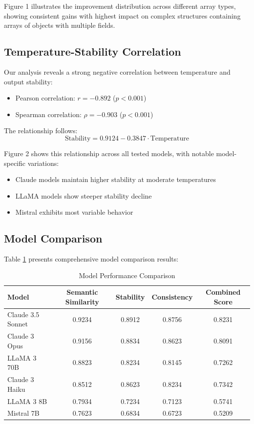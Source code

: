 \documentclass[letterpaper]{article} %
\begin{document}
Figure 1 illustrates the improvement distribution across different array types, showing consistent gains with highest impact on complex structures containing arrays of objects with multiple fields.

\subsection{Temperature-Stability Correlation}

Our analysis reveals a strong negative correlation between temperature and output stability:
\begin{itemize}
\item Pearson correlation: $r = -0.892$ ($p < 0.001$)
\item Spearman correlation: $\rho = -0.903$ ($p < 0.001$)
\end{itemize}

The relationship follows:
\begin{equation}
\text{Stability} = 0.9124 - 0.3847 \cdot \text{Temperature}
\end{equation}

Figure 2 shows this relationship across all tested models, with notable model-specific variations:
\begin{itemize}
\item Claude models maintain higher stability at moderate temperatures
\item LLaMA models show steeper stability decline
\item Mistral exhibits most variable behavior
\end{itemize}

\subsection{Model Comparison}

Table \ref{tab:model_comparison} presents comprehensive model comparison results:

\begin{table}[h]
\centering
\caption{Model Performance Comparison}
\label{tab:model_comparison}
\begin{tabular}{lcccc}
\toprule
Model & Semantic Similarity & Stability & Consistency & Combined Score \\
\midrule
Claude 3.5 Sonnet & 0.9234 & 0.8912 & 0.8756 & 0.8231 \\
Claude 3 Opus & 0.9156 & 0.8834 & 0.8623 & 0.8091 \\
LLaMA 3 70B & 0.8823 & 0.8234 & 0.8145 & 0.7262 \\
Claude 3 Haiku & 0.8512 & 0.8623 & 0.8234 & 0.7342 \\
LLaMA 3 8B & 0.7934 & 0.7234 & 0.7123 & 0.5741 \\
Mistral 7B & 0.7623 & 0.6834 & 0.6723 & 0.5209 \\
\bottomrule
\end{tabular}
\end{table}
\end{document}
